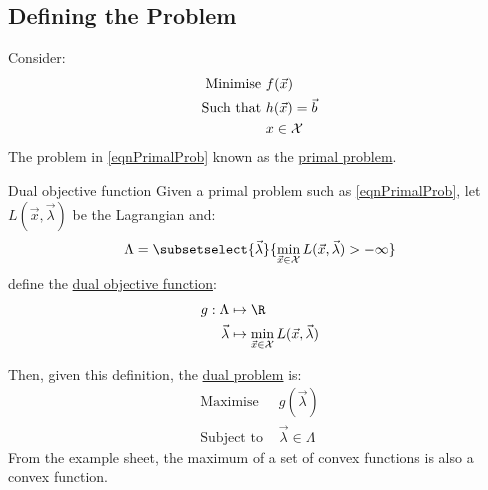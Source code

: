 \documentclass[../Main.tex]{subfiles}
\begin{document}
\subsection{Defining the Problem}
Consider:
\begin{align}
    \text{Minimise } &f(\vec{x}) \nonumber\\
    \text{Such that } &h(\vec{x}) = \vec{b} \label{eqnPrimalProb} \\
    &x \in \mathcal{X} \nonumber
\end{align}
The problem in \ref{eqnPrimalProb} known as the \underline{primal problem}.
\begin{definition}{Dual objective function}
    Given a primal problem such as \ref{eqnPrimalProb}, let $L(\vec{x}, \vec{\lambda})$ be the Lagrangian and:
    \begin{equation*}
        \Lambda = \subsetselect{\vec{\lambda}}{\min_{\vec{x} \in \Xset} L(\vec{x}, \vec{\lambda}) > -\infty}
    \end{equation*}
    define the \underline{dual objective function}:
    \begin{align*}
        g : \Lambda &\mapsto \R \\
        \vec{\lambda} &\mapsto \min_{\vec{x} \in \Xset} L(\vec{x}, \vec{\lambda})
    \end{align*}
\end{definition}
Then, given this definition, the \underline{dual problem} is:
\begin{align}
    \text{Maximise } &g(\vec{\lambda}) \nonumber\\
    \text{Subject to } &\vec{\lambda} \in \Lambda \label{eqnDualProb}
\end{align}
From the example sheet, the maximum of a set of convex functions is also a convex function.
\end{document}
